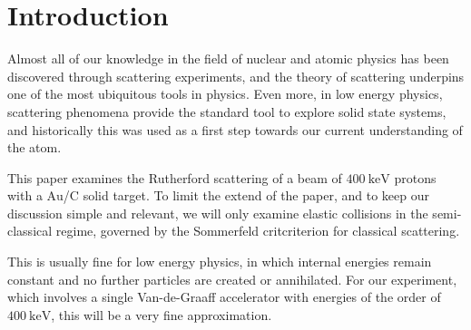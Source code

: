 \section{Introduction} 
Almost all of our knowledge in the field of nuclear and atomic physics has been
discovered through scattering experiments, and the theory of scattering underpins
one of the most ubiquitous tools in physics.
Even more, in low energy physics, scattering phenomena provide the standard tool to
explore solid state systems, and historically this was used as a first step
towards our current understanding of the atom.

This paper examines the Rutherford scattering of a beam of $\SI{400}{\kilo\electronvolt}$
protons with a $\mathrm{Au}$/$\mathrm{C}$ solid target. To limit the extend of
the paper, and to keep our discussion simple and relevant, we will only examine
elastic collisions in the semi-classical regime, governed by the Sommerfeld
critcriterion for classical scattering. \parencite[p. 14]{noteBB}

This is usually fine for low energy physics, in which internal energies remain
constant and no further particles are created or annihilated.
For our experiment, which involves a single Van-de-Graaff accelerator with
energies of the order of $\SI{400}{\kilo\electronvolt}$, this will be a very
fine approximation.



